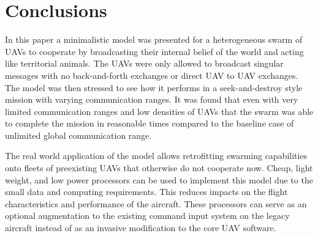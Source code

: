 \chapter{Conclusions}
\label{chap:conclusion}

In this paper a minimalistic model was presented for a heterogeneous swarm of UAVs to cooperate by broadcasting their internal belief of the world and acting like territorial animals.  The UAVs were only allowed to broadcast singular messages with no back-and-forth exchanges or direct UAV to UAV exchanges.  The model was then stressed to see how it performs in a seek-and-destroy style mission with varying communication ranges.  It was found that even with very limited communication ranges and low densities of UAVs that the swarm was able to complete the mission in reasonable times compared to the baseline case of unlimited global communication range.

The real world application of the model allows retrofitting swarming capabilities onto fleets of preexisting UAVs that otherwise do not cooperate now.  Cheap, light weight, and low power processors can be used to implement this model due to the small data and computing requirements.  This reduces impacts on the flight characteristics and performance of the aircraft.  These processors can serve as an optional augmentation to the existing command input system on the legacy aircraft instead of as an invasive modification to the core UAV software.




